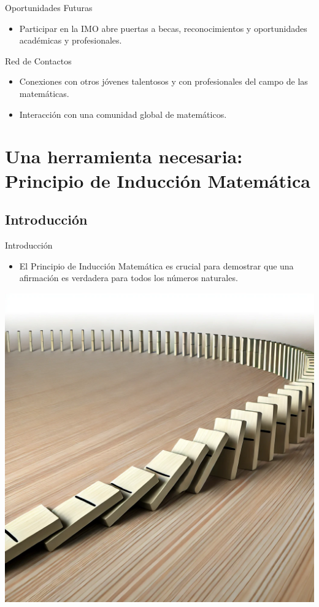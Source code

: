 \documentclass{beamer}
\begin{document}
\begin{frame}{Oportunidades Futuras}
    \begin{itemize}
        \item Participar en la IMO abre puertas a becas, reconocimientos y oportunidades académicas y profesionales.
    \end{itemize}
\end{frame}

\begin{frame}{Red de Contactos}
    \begin{itemize}
        \item Conexiones con otros jóvenes talentosos y con profesionales del campo de las matemáticas.
        \item Interacción con una comunidad global de matemáticos.
    \end{itemize}
\end{frame}

\section{Una herramienta necesaria: Principio de Inducción Matemática}
\subsection{Introducción}
\begin{frame}{Introducción}
    \begin{itemize}
        \item El Principio de Inducción Matemática es crucial para demostrar que una afirmación es verdadera para todos los números naturales.
    \end{itemize}
    \begin{center}
        \includegraphics[scale=.1]{images/dominos.png}
    \end{center}
\end{frame}
\end{document}
